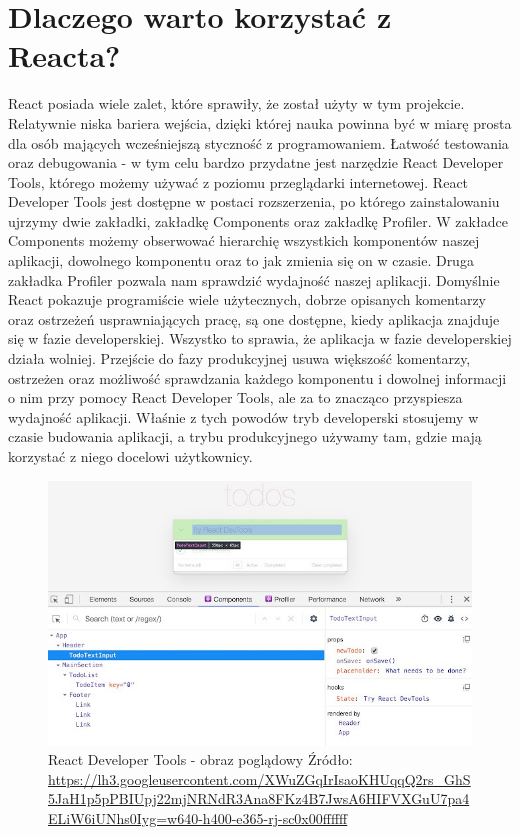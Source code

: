 \documentclass[oneside,polski,logo,indent]{amuthesis}
\begin{document}
\section{Dlaczego warto korzystać z Reacta?}{
React posiada wiele zalet, które sprawiły, że został użyty w tym projekcie. Relatywnie niska bariera wejścia, dzięki której nauka powinna być w miarę prosta dla osób mających wcześniejszą styczność z programowaniem. Łatwość testowania oraz debugowania - w tym celu bardzo przydatne jest narzędzie React Developer Tools, którego możemy używać z poziomu przeglądarki internetowej. React Developer Tools jest dostępne w postaci rozszerzenia, po którego zainstalowaniu ujrzymy dwie zakładki, zakładkę Components oraz zakładkę Profiler. W zakładce Components możemy obserwować hierarchię wszystkich komponentów naszej aplikacji, dowolnego komponentu oraz to jak zmienia się on w czasie. Druga zakładka Profiler pozwala nam sprawdzić wydajność naszej aplikacji. Domyślnie React pokazuje programiście wiele użytecznych, dobrze opisanych komentarzy oraz ostrzeżeń usprawniających pracę, są one dostępne, kiedy aplikacja znajduje się w fazie developerskiej. Wszystko to sprawia, że aplikacja w fazie developerskiej działa wolniej. Przejście do fazy produkcyjnej usuwa większość komentarzy, ostrzeżen oraz możliwość sprawdzania każdego komponentu i dowolnej informacji o nim przy pomocy React Developer Tools, ale za to znacząco przyspiesza wydajność aplikacji.
Właśnie z tych powodów tryb developerski stosujemy w czasie budowania aplikacji, a trybu produkcyjnego używamy tam, gdzie mają korzystać z niego docelowi użytkownicy.



\begin{figure}[H]
\centering
\includegraphics[width=13cm]{react dev example.jpg}
\caption{React Developer Tools - obraz poglądowy
\newline
Źródło: \url{https://lh3.googleusercontent.com/XWuZGqIrIsaoKHUqqQ2rs_GhS5JaH1p5pPBIUpj22mjNRNdR3Ana8FKz4B7JwsA6HIFVXGuU7pa4ELiW6iUNhs0Iyg=w640-h400-e365-rj-sc0x00ffffff}
}
\label{react dev example.jpg}
\end{figure}

}
\end{document}
